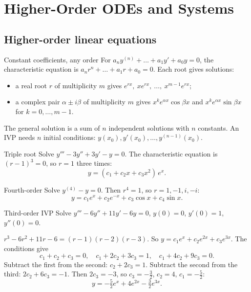 \chapter{Higher-Order ODEs and Systems}

\section{Higher-order linear equations}

\begin{methodbox}{Constant coefficients, any order}
For $a_ny^{(n)} + \dots + a_1y' + a_0y = 0$, the characteristic equation is $a_nr^n + \dots + a_1r + a_0 = 0$. Each root gives solutions:
\begin{itemize}
  \item a real root $r$ of multiplicity $m$ gives $e^{rx},\ xe^{rx},\ \dots,\ x^{m-1}e^{rx}$;
  \item a complex pair $\alpha\pm i\beta$ of multiplicity $m$ gives $x^{k}e^{\alpha x}\cos\beta x$ and $x^{k}e^{\alpha x}\sin\beta x$ for $k = 0,\dots,m-1$.
\end{itemize}
The general solution is a sum of $n$ independent solutions with $n$ constants. An IVP needs $n$ initial conditions: $y(x_0), y'(x_0), \dots, y^{(n-1)}(x_0)$.
\end{methodbox}

\begin{examplebox}{Triple root}
Solve $y''' - 3y'' + 3y' - y = 0$. The characteristic equation is $(r-1)^3 = 0$, so $r=1$ three times:
\[ y = (c_1 + c_2x + c_3x^2)\,e^{x}. \]
\end{examplebox}

\begin{examplebox}{Fourth-order}
Solve $y^{(4)} - y = 0$. Then $r^4 = 1$, so $r = 1, -1, i, -i$:
\[ y = c_1e^{x} + c_2e^{-x} + c_3\cos x + c_4\sin x. \]
\end{examplebox}

\begin{examplebox}{Third-order IVP}
Solve $y''' - 6y'' + 11y' - 6y = 0$, \; $y(0)=0$, \; $y'(0)=1$, \; $y''(0)=0$.

$r^3 - 6r^2 + 11r - 6 = (r-1)(r-2)(r-3)$. So $y = c_1e^{x} + c_2e^{2x} + c_3e^{3x}$. The conditions give
\[ c_1 + c_2 + c_3 = 0,\quad c_1 + 2c_2 + 3c_3 = 1,\quad c_1 + 4c_2 + 9c_3 = 0. \]
Subtract the first from the second: $c_2 + 2c_3 = 1$. Subtract the second from the third: $2c_2 + 6c_3 = -1$. Then $2c_3 = -3$, so $c_3 = -\tfrac32$, $c_2 = 4$, $c_1 = -\tfrac52$:
\[ y = -\tfrac52e^{x} + 4e^{2x} - \tfrac32e^{3x}. \]
\end{examplebox}

